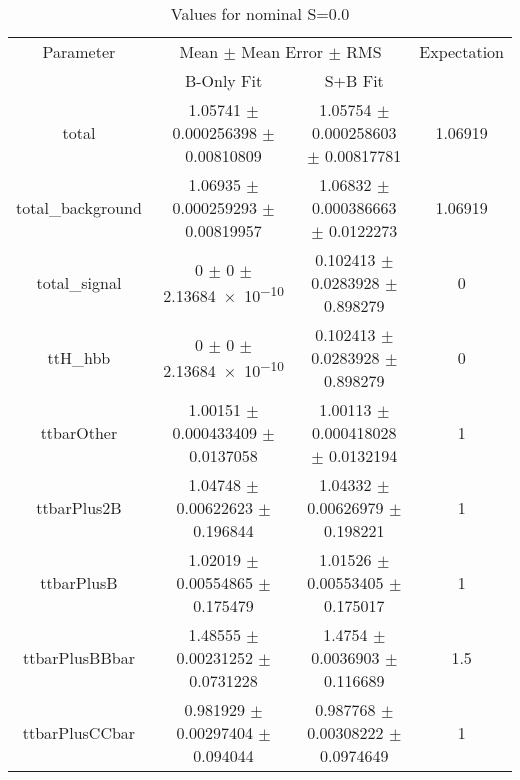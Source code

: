\begin{table}
\centering
\caption{Values for nominal S=0.0}
\begin{tabular}{cccc}
\toprule
Parameter & \multicolumn{2}{c}{Mean $\pm$ Mean Error $\pm$ RMS} & Expectation\\
 & B-Only Fit & S+B Fit & \\
\midrule
total & \num{1.05741} $\pm$ \num{0.000256398} $\pm$ \num{0.00810809} & \num{1.05754} $\pm$ \num{0.000258603} $\pm$ \num{0.00817781} & \num{1.06919}\\
total\_background & \num{1.06935} $\pm$ \num{0.000259293} $\pm$ \num{0.00819957} & \num{1.06832} $\pm$ \num{0.000386663} $\pm$ \num{0.0122273} & \num{1.06919}\\
total\_signal & \num{0} $\pm$ \num{0} $\pm$ \num{2.13684e-10} & \num{0.102413} $\pm$ \num{0.0283928} $\pm$ \num{0.898279} & \num{0}\\
ttH\_hbb & \num{0} $\pm$ \num{0} $\pm$ \num{2.13684e-10} & \num{0.102413} $\pm$ \num{0.0283928} $\pm$ \num{0.898279} & \num{0}\\
ttbarOther & \num{1.00151} $\pm$ \num{0.000433409} $\pm$ \num{0.0137058} & \num{1.00113} $\pm$ \num{0.000418028} $\pm$ \num{0.0132194} & \num{1}\\
ttbarPlus2B & \num{1.04748} $\pm$ \num{0.00622623} $\pm$ \num{0.196844} & \num{1.04332} $\pm$ \num{0.00626979} $\pm$ \num{0.198221} & \num{1}\\
ttbarPlusB & \num{1.02019} $\pm$ \num{0.00554865} $\pm$ \num{0.175479} & \num{1.01526} $\pm$ \num{0.00553405} $\pm$ \num{0.175017} & \num{1}\\
ttbarPlusBBbar & \num{1.48555} $\pm$ \num{0.00231252} $\pm$ \num{0.0731228} & \num{1.4754} $\pm$ \num{0.0036903} $\pm$ \num{0.116689} & \num{1.5}\\
ttbarPlusCCbar & \num{0.981929} $\pm$ \num{0.00297404} $\pm$ \num{0.094044} & \num{0.987768} $\pm$ \num{0.00308222} $\pm$ \num{0.0974649} & \num{1}\\
\bottomrule
\end{tabular}
\end{table}